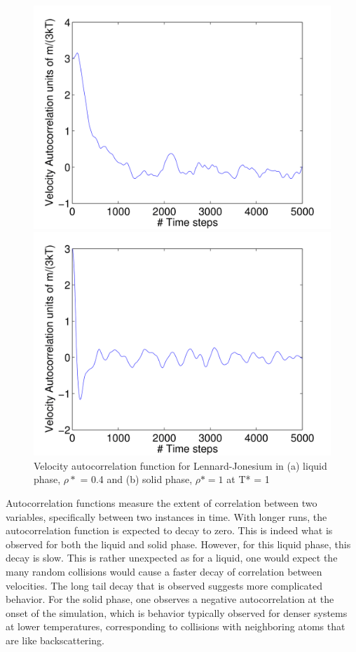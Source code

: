 \documentclass[12pt, oneside]{article}
\begin{document}
\begin{figure}
\begin{minipage}[!htbp]{.5\linewidth}
\includegraphics[width=\textwidth]{./figs/ex12-vac-liq.png}
\subcaption{}
\end{minipage}
\begin{minipage}[!htbp]{.5\linewidth}
\includegraphics[width=\textwidth]{./figs/ex12-vac-sol.png}
\subcaption{}
\end{minipage}
\caption{Velocity autocorrelation function for Lennard-Jonesium in (a) liquid phase, $\rho*$ = 0.4 and  (b) solid phase, $\rho* = 1$ at T* = 1}
\label{fig:vac}
\end{figure}

Autocorrelation functions measure the extent of correlation between two variables, specifically between two instances in time. With longer runs, the autocorrelation function is expected to decay to zero. This is indeed what is observed for both the liquid and solid phase. However, for this liquid phase, this decay is slow. This is rather unexpected as for a liquid, one would expect the many random collisions would cause a faster decay of correlation between velocities. The long tail decay that is observed suggests more complicated behavior. For the solid phase, one observes a negative autocorrelation at the onset of the simulation, which is behavior typically observed for denser systems at lower temperatures, corresponding to collisions with neighboring atoms that are like backscattering.
\end{document}
